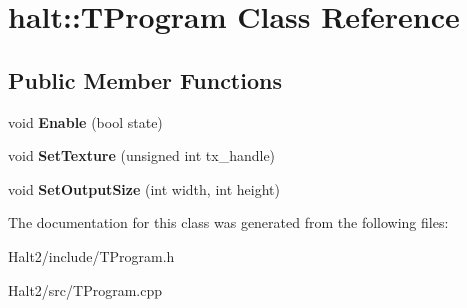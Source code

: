 \hypertarget{classhalt_1_1_t_program}{\section{halt\-:\-:\-T\-Program \-Class \-Reference}
\label{classhalt_1_1_t_program}
}
\subsection*{\-Public \-Member \-Functions}
\begin{DoxyCompactItemize}
\item 
\hypertarget{classhalt_1_1_t_program_a87f906292cb7da2c40779629e5881a40}{void {\bfseries \-Enable} (bool state)}\label{classhalt_1_1_t_program_a87f906292cb7da2c40779629e5881a40}

\item 
\hypertarget{classhalt_1_1_t_program_a01c8e0d1b3d1842130cff47add86313a}{void {\bfseries \-Set\-Texture} (unsigned int tx\-\_\-handle)}\label{classhalt_1_1_t_program_a01c8e0d1b3d1842130cff47add86313a}

\item 
\hypertarget{classhalt_1_1_t_program_a69d7d855604c3739c9d3914c9270c1ad}{void {\bfseries \-Set\-Output\-Size} (int width, int height)}\label{classhalt_1_1_t_program_a69d7d855604c3739c9d3914c9270c1ad}

\end{DoxyCompactItemize}


\-The documentation for this class was generated from the following files\-:\begin{DoxyCompactItemize}
\item 
\-Halt2/include/\-T\-Program.\-h\item 
\-Halt2/src/\-T\-Program.\-cpp\end{DoxyCompactItemize}
